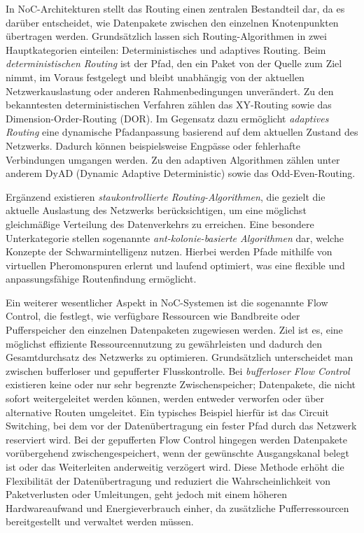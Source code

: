 In NoC-Architekturen stellt das Routing einen zentralen Bestandteil dar, da es darüber entscheidet, wie Datenpakete zwischen den einzelnen Knotenpunkten übertragen werden. Grundsätzlich lassen sich Routing-Algorithmen in zwei Hauptkategorien einteilen: Deterministisches und adaptives Routing. Beim \textit{deterministischen Routing} ist der Pfad, den ein Paket von der Quelle zum Ziel nimmt, im Voraus festgelegt und bleibt unabhängig von der aktuellen Netzwerkauslastung oder anderen Rahmenbedingungen unverändert. Zu den bekanntesten deterministischen Verfahren zählen das XY-Routing sowie das Dimension-Order-Routing (DOR). Im Gegensatz dazu ermöglicht \textit{adaptives Routing} eine dynamische Pfadanpassung basierend auf dem aktuellen Zustand des Netzwerks. Dadurch können beispielsweise Engpässe oder fehlerhafte Verbindungen umgangen werden. Zu den adaptiven Algorithmen zählen unter anderem DyAD (Dynamic Adaptive Deterministic) sowie das Odd-Even-Routing.

Ergänzend existieren \textit{staukontrollierte Routing-Algorithmen}, die gezielt die aktuelle Auslastung des Netzwerks berücksichtigen, um eine möglichst gleichmäßige Verteilung des Datenverkehrs zu erreichen. Eine besondere Unterkategorie stellen sogenannte \textit{ant-kolonie-basierte Algorithmen} dar, welche Konzepte der Schwarmintelligenz nutzen. Hierbei werden Pfade mithilfe von virtuellen Pheromonspuren erlernt und laufend optimiert, was eine flexible und anpassungsfähige Routenfindung ermöglicht.

Ein weiterer wesentlicher Aspekt in NoC-Systemen ist die sogenannte Flow Control, die festlegt, wie verfügbare Ressourcen wie Bandbreite oder Pufferspeicher den einzelnen Datenpaketen zugewiesen werden. Ziel ist es, eine möglichst effiziente Ressourcennutzung zu gewährleisten und dadurch den Gesamtdurchsatz des Netzwerks zu optimieren. Grundsätzlich unterscheidet man zwischen bufferloser und gepufferter Flusskontrolle. Bei \textit{bufferloser Flow Control} existieren keine oder nur sehr begrenzte Zwischenspeicher; Datenpakete, die nicht sofort weitergeleitet werden können, werden entweder verworfen oder über alternative Routen umgeleitet. Ein typisches Beispiel hierfür ist das Circuit Switching, bei dem vor der Datenübertragung ein fester Pfad durch das Netzwerk reserviert wird. Bei der gepufferten Flow Control hingegen werden Datenpakete vorübergehend zwischengespeichert, wenn der gewünschte Ausgangskanal belegt ist oder das Weiterleiten anderweitig verzögert wird. Diese Methode erhöht die Flexibilität der Datenübertragung und reduziert die Wahrscheinlichkeit von Paketverlusten oder Umleitungen, geht jedoch mit einem höheren Hardwareaufwand und Energieverbrauch einher, da zusätzliche Pufferressourcen bereitgestellt und verwaltet werden müssen.

